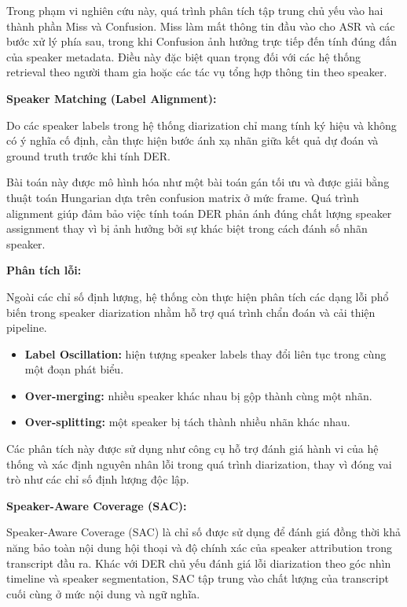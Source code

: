 Trong phạm vi nghiên cứu này, quá trình phân tích tập trung chủ yếu vào hai thành phần Miss và Confusion. Miss làm mất thông tin đầu vào cho ASR và các bước xử lý phía sau, trong khi Confusion ảnh hưởng trực tiếp đến tính đúng đắn của speaker metadata. Điều này đặc biệt quan trọng đối với các hệ thống retrieval theo người tham gia hoặc các tác vụ tổng hợp thông tin theo speaker.

\textbf{Speaker Matching (Label Alignment):}

Do các speaker labels trong hệ thống diarization chỉ mang tính ký hiệu và không có ý nghĩa cố định, cần thực hiện bước ánh xạ nhãn giữa kết quả dự đoán và ground truth trước khi tính DER.

Bài toán này được mô hình hóa như một bài toán gán tối ưu và được giải bằng thuật toán Hungarian dựa trên confusion matrix ở mức frame. Quá trình alignment giúp đảm bảo việc tính toán DER phản ánh đúng chất lượng speaker assignment thay vì bị ảnh hưởng bởi sự khác biệt trong cách đánh số nhãn speaker.

\textbf{Phân tích lỗi:}

Ngoài các chỉ số định lượng, hệ thống còn thực hiện phân tích các dạng lỗi phổ biến trong speaker diarization nhằm hỗ trợ quá trình chẩn đoán và cải thiện pipeline.

\begin{itemize}
    \item \textbf{Label Oscillation:} hiện tượng speaker labels thay đổi liên tục trong cùng một đoạn phát biểu.
    
    \item \textbf{Over-merging:} nhiều speaker khác nhau bị gộp thành cùng một nhãn.
    
    \item \textbf{Over-splitting:} một speaker bị tách thành nhiều nhãn khác nhau.
\end{itemize}

Các phân tích này được sử dụng như công cụ hỗ trợ đánh giá hành vi của hệ thống và xác định nguyên nhân lỗi trong quá trình diarization, thay vì đóng vai trò như các chỉ số định lượng độc lập.

\textbf{Speaker-Aware Coverage (SAC):}

Speaker-Aware Coverage (SAC) là chỉ số được sử dụng để đánh giá đồng thời khả năng bảo toàn nội dung hội thoại và độ chính xác của speaker attribution trong transcript đầu ra. Khác với DER chủ yếu đánh giá lỗi diarization theo góc nhìn timeline và speaker segmentation, SAC tập trung vào chất lượng của transcript cuối cùng ở mức nội dung và ngữ nghĩa.


